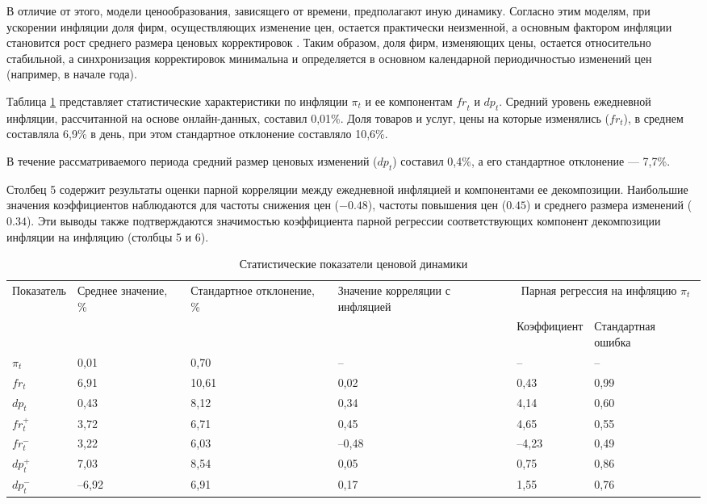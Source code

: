 В отличие от этого, модели ценообразования, зависящего от времени, предполагают иную динамику. Согласно этим моделям, при ускорении инфляции доля фирм, осуществляющих изменение цен, остается практически неизменной, а основным фактором инфляции становится рост среднего размера ценовых корректировок \cite{Taylor1980, Calvo1983}. Таким образом, доля фирм, изменяющих цены, остается относительно стабильной, а синхронизация корректировок минимальна и определяется в основном календарной периодичностью изменений цен (например, в начале года).

Таблица \ref{tab:inflation_stats} представляет статистические характеристики по инфляции $\pi_t$ и ее компонентам $\mathit{fr}_t$ и $\mathit{dp}_t$. Средний уровень ежедневной инфляции, рассчитанной на основе онлайн-данных, составил 0,01\%. Доля товаров и услуг, цены на которые изменялись (\( fr_t \)), в среднем составляла 6,9\% в день, при этом стандартное отклонение составляло 10,6\%.  

В течение рассматриваемого периода средний размер ценовых изменений (\( dp_t \)) составил 0,4\%, а его стандартное отклонение — 7,7\%.  

Столбец 5 содержит результаты оценки парной корреляции между ежедневной инфляцией и компонентами ее декомпозиции. Наибольшие значения коэффициентов наблюдаются для частоты снижения цен (\(-0.48\)), частоты повышения цен (\(0.45\)) и среднего размера изменений (\(0.34\)).  Эти выводы также подтверждаются значимостью коэффициента парной регрессии соответствующих компонент декомпозиции инфляции на инфляцию (столбцы 5 и 6).

\begin{table}[h]
	\centering
	\small  %
	\caption{Статистические показатели ценовой динамики}
	\label{tab:inflation_stats}
	\begin{tabularx}{\textwidth}{|X|X|X|X|X|X|}
		\hline
		Показатель & Среднее значение, \% & Стандартное отклонение, \% & Значение корреляции с инфляцией & \multicolumn{2}{c|}{Парная регрессия на инфляцию $\pi_t$} \\
		\cline{5-6}
		& & & & Коэффициент & Стандартная ошибка \\
		\hline
		$\pi_t$         & 0,01  & 0,70  & –     & –     & –    \\
		$fr_t$         & 6,91  & 10,61 & 0,02  & 0,43  & 0,99 \\
		$dp_t$         & 0,43  & 8,12  & 0,34  & 4,14  & 0,60 \\
		$fr_t^{+}$     & 3,72  & 6,71  & 0,45  & 4,65  & 0,55 \\
		$fr_t^{-}$     & 3,22  & 6,03  & –0,48 & –4,23 & 0,49 \\
		$dp_t^{+}$     & 7,03  & 8,54  & 0,05  & 0,75  & 0,86 \\
		$dp_t^{-}$     & –6,92 & 6,91  & 0,17  & 1,55  & 0,76 \\
		\hline
	\end{tabularx}
\end{table}


